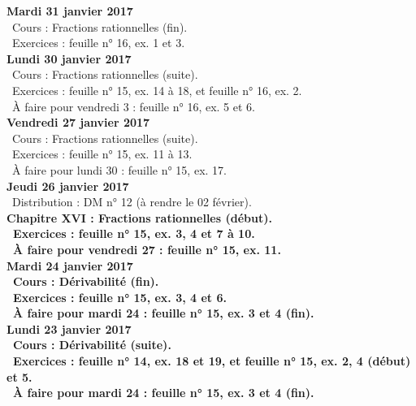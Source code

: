 \documentclass[12pt,a4paper]{article}
\begin{document}
\noindent\textbf{ Mardi 31 janvier 2017} \\
\bu\ Cours : Fractions rationnelles (fin).\\
\bu\ Exercices : feuille n° 16, ex. 1 et 3.\vspace{.4cm}\\

\noindent\textbf{ Lundi 30 janvier 2017} \\
\bu\ Cours : Fractions rationnelles (suite).\\
\bu\ Exercices : feuille n° 15, ex. 14 à 18, et feuille n° 16, ex. 2.\\
\bu\ À faire pour vendredi 3 : feuille n° 16, ex. 5 et 6.\vspace{.4cm}\\ 

\noindent\textbf{Vendredi 27 janvier 2017}\\
\bu\ Cours : Fractions rationnelles (suite).\\
\bu\ Exercices : feuille n° 15, ex. 11 à 13.\\
\bu\ À faire pour lundi 30 : feuille n° 15, ex. 17.\vspace{.4cm}\\  

\noindent\textbf{Jeudi 26 janvier 2017}\\
\bu\ Distribution : DM n° 12 (à rendre le 02 février).\\
\bf Chapitre XVI \rm : Fractions rationnelles (début).\\
\bu\ Exercices : feuille n° 15, ex. 3, 4 et 7 à 10.\\
\bu\ À faire pour vendredi 27 : feuille n° 15, ex. 11.\vspace{.4cm}\\  

\noindent\textbf{ Mardi 24 janvier 2017} \\
\bu\ Cours : Dérivabilité (fin).\\
\bu\ Exercices : feuille n° 15, ex. 3, 4 et 6.\\
\bu\ À faire pour mardi 24 : feuille n° 15, ex. 3 et 4 (fin).\vspace{.4cm}\\  

\noindent\textbf{ Lundi 23 janvier 2017} \\
\bu\ Cours : Dérivabilité (suite).\\
\bu\ Exercices : feuille n° 14, ex. 18 et 19, et feuille n° 15, ex. 2, 4 (début) et 5.\\
\bu\ À faire pour mardi 24 : feuille n° 15, ex. 3 et 4 (fin).\vspace{.4cm}\\  
\end{document}
